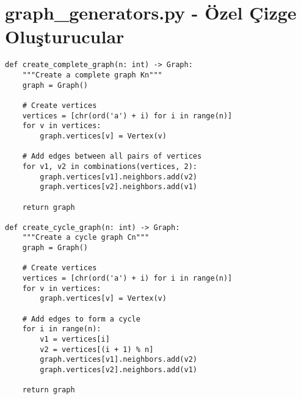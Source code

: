 \documentclass[12pt]{article}
\begin{document}
\section{graph\_generators.py - Özel Çizge Oluşturucular}
\begin{lstlisting}
def create_complete_graph(n: int) -> Graph:
    """Create a complete graph Kn"""
    graph = Graph()
    
    # Create vertices
    vertices = [chr(ord('a') + i) for i in range(n)]
    for v in vertices:
        graph.vertices[v] = Vertex(v)
        
    # Add edges between all pairs of vertices
    for v1, v2 in combinations(vertices, 2):
        graph.vertices[v1].neighbors.add(v2)
        graph.vertices[v2].neighbors.add(v1)
        
    return graph

def create_cycle_graph(n: int) -> Graph:
    """Create a cycle graph Cn"""
    graph = Graph()
    
    # Create vertices
    vertices = [chr(ord('a') + i) for i in range(n)]
    for v in vertices:
        graph.vertices[v] = Vertex(v)
        
    # Add edges to form a cycle
    for i in range(n):
        v1 = vertices[i]
        v2 = vertices[(i + 1) % n]
        graph.vertices[v1].neighbors.add(v2)
        graph.vertices[v2].neighbors.add(v1)
        
    return graph
\end{lstlisting}
\end{document}
